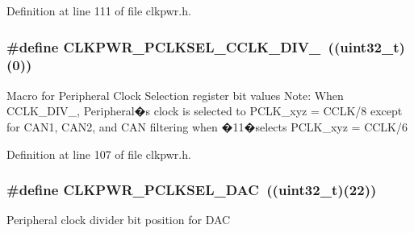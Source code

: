 Definition at line 111 of file clkpwr.\+h.

\subsubsection[{\texorpdfstring{C\+L\+K\+P\+W\+R\+\_\+\+P\+C\+L\+K\+S\+E\+L\+\_\+\+C\+C\+L\+K\+\_\+\+D\+I\+V\+\_\+4}{CLKPWR_PCLKSEL_CCLK_DIV_4}}]{\setlength{\rightskip}{0pt plus 5cm}\#define C\+L\+K\+P\+W\+R\+\_\+\+P\+C\+L\+K\+S\+E\+L\+\_\+\+C\+C\+L\+K\+\_\+\+D\+I\+V\+\_~(({\bf uint32\+\_\+t})(0))}\hypertarget{group___c_l_k_p_w_r___public___macros_gaf7b612823ab87d3d6358df977364b547}{}\label{group___c_l_k_p_w_r___public___macros_gaf7b612823ab87d3d6358df977364b547}
Macro for Peripheral Clock Selection register bit values Note\+: When C\+C\+L\+K\+\_\+\+D\+I\+V\+\_, Peripheral�s clock is selected to P\+C\+L\+K\+\_\+xyz = C\+C\+L\+K/8 except for C\+A\+N1, C\+A\+N2, and C\+AN filtering when �11�selects P\+C\+L\+K\+\_\+xyz = C\+C\+L\+K/6 

Definition at line 107 of file clkpwr.\+h.

\subsubsection[{\texorpdfstring{C\+L\+K\+P\+W\+R\+\_\+\+P\+C\+L\+K\+S\+E\+L\+\_\+\+D\+AC}{CLKPWR_PCLKSEL_DAC}}]{\setlength{\rightskip}{0pt plus 5cm}\#define C\+L\+K\+P\+W\+R\+\_\+\+P\+C\+L\+K\+S\+E\+L\+\_\+\+D\+AC~(({\bf uint32\+\_\+t})(22))}\hypertarget{group___c_l_k_p_w_r___public___macros_gad78e9911438a7b9006e89a11ab747de5}{}\label{group___c_l_k_p_w_r___public___macros_gad78e9911438a7b9006e89a11ab747de5}
Peripheral clock divider bit position for D\+AC 

